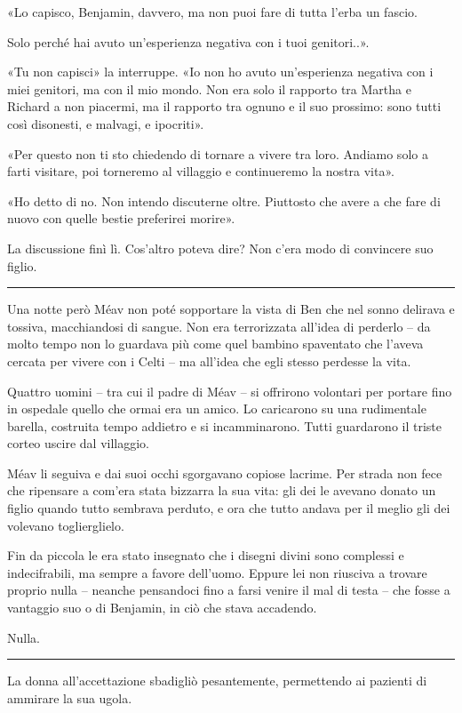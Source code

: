 «Lo capisco, Benjamin, davvero, ma non puoi fare di tutta l'erba un fascio.

Solo perché hai avuto un'esperienza negativa con i tuoi genitori..».

«Tu non capisci» la interruppe. «Io non ho avuto un'esperienza negativa con i miei genitori, ma con
il mio mondo. Non era solo il rapporto tra Martha e Richard a non piacermi, ma il rapporto tra
ognuno e il suo prossimo: sono tutti così disonesti, e malvagi, e ipocriti».

«Per questo non ti sto chiedendo di tornare a vivere tra loro. Andiamo solo a farti visitare, poi
torneremo al villaggio e continueremo la nostra vita».

«Ho detto di no. Non intendo discuterne oltre. Piuttosto che avere a che fare di nuovo con quelle
bestie preferirei morire».

La discussione finì lì. Cos'altro poteva dire? Non c'era modo di convincere suo figlio.

\plainbreak{1}

Una notte però Méav non poté sopportare la vista di Ben che nel sonno delirava e tossiva,
macchiandosi di sangue. Non era terrorizzata all'idea di perderlo -- da molto tempo non lo guardava
più come quel bambino spaventato che l'aveva cercata per vivere con i Celti -- ma all'idea che egli
stesso perdesse la vita.

Quattro uomini -- tra cui il padre di Méav -- si offrirono volontari per portare fino in ospedale
quello che ormai era un amico. Lo caricarono su una rudimentale barella, costruita tempo addietro e
si incamminarono. Tutti guardarono il triste corteo uscire dal villaggio.

Méav li seguiva e dai suoi occhi sgorgavano copiose lacrime. Per strada non fece che ripensare a
com'era stata bizzarra la sua vita: gli dei le avevano donato un figlio quando tutto sembrava
perduto, e ora che tutto andava per il meglio gli dei volevano toglierglielo.

Fin da piccola le era stato insegnato che i disegni divini sono complessi e indecifrabili, ma sempre
a favore dell'uomo. Eppure lei non riusciva a trovare proprio nulla -- neanche pensandoci fino a
farsi venire il mal di testa -- che fosse a vantaggio suo o di Benjamin, in ciò che stava accadendo.

Nulla.

\plainbreak{1}

La donna all'accettazione sbadigliò pesantemente, permettendo ai pazienti di ammirare la sua ugola.


